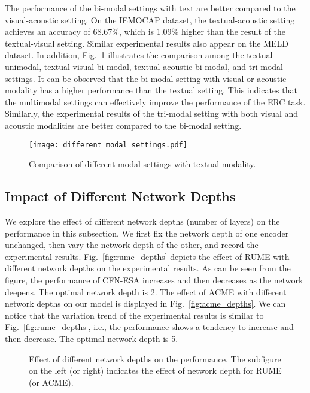 \documentclass[journal]{IEEEtran}
\begin{document}
The performance of the bi-modal settings with text are better compared to the visual-acoustic setting. On the IEMOCAP dataset, the textual-acoustic setting achieves an accuracy of 68.67\%, which is 1.09\% higher than the result of the textual-visual setting. Similar experimental results also appear on the MELD dataset. In addition, Fig.~\ref{fig:different_modal_settings} illustrates the comparison among the textual unimodal, textual-visual bi-modal, textual-acoustic bi-modal, and tri-modal settings. It can be observed that the bi-modal setting with visual or acoustic modality has a higher performance than the textual setting. This indicates that the multimodal settings can effectively improve the performance of the ERC task. Similarly, the experimental results of the tri-modal setting with both visual and acoustic modalities are better compared to the bi-modal setting.
\begin{figure}[htbp]
    \centering
    \texttt{[image: different\_modal\_settings.pdf]}
    \caption{Comparison of different modal settings with textual modality.}
    \label{fig:different_modal_settings}
\end{figure}

\subsection{Impact of Different Network Depths}
We explore the effect of different network depths (number of layers) on the performance in this subsection. We first fix the network depth of one encoder unchanged, then vary the network depth of the other, and record the experimental results. Fig.~\ref{fig:rume_depths} depicts the effect of RUME with different network depths on the experimental results. As can be seen from the figure, the performance of CFN-ESA increases and then decreases as the network deepens. The optimal network depth is 2. The effect of ACME with different network depths on our model is displayed in Fig.~\ref{fig:acme_depths}. We can notice that the variation trend of the experimental results is similar to Fig.~\ref{fig:rume_depths}, i.e., the performance shows a tendency to increase and then decrease. The optimal network depth is 5.
\begin{figure*}[htbp]
    \centering
    \hfil
    \caption{Effect of different network depths on the performance. The subfigure on the left (or right) indicates the effect of network depth for RUME (or ACME).}
    \label{fig:depths}
\end{figure*}
\end{document}
